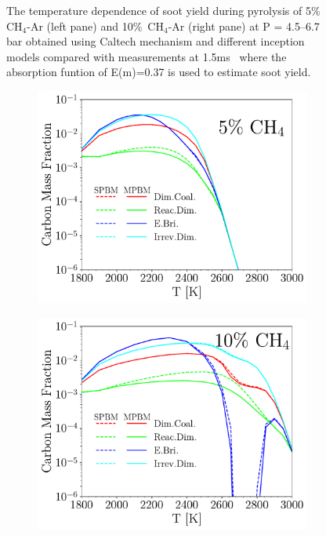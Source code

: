 \begin{figure}[H]
\begin{subfigure}[t]{0.4\textwidth}
	\end{subfigure}
	\caption{The temperature dependence of soot yield during pyrolysis of 5\%~$\mathrm{CH_4}$-Ar (left pane) and 10\%~$\mathrm{CH_4}$-Ar (right pane) at $\mathrm{P}$ = 4.5–6.7 bar obtained using Caltech mechanism and different inception models compared with measurements at 1.5ms~\cite{agafonov2016unified} where the absorption funtion of E(m)=0.37 is used to estimate soot yield.}
	\label{fig:shocktubeyield} 
\end{figure}


\begin{figure}[H]
	\centering
	\begin{subfigure}[t]{0.4\textwidth}
		\includegraphics[width=1\textwidth]{Figures/Results/Shocktube/Agafonov2016/5CH4/AAAA.pdf}
	\end{subfigure}
	\begin{subfigure}[t]{0.4\textwidth}
		\includegraphics[width=1\textwidth]{Figures/Results/Shocktube/Agafonov2016/10CH4/AAAA.pdf}

\end{subfigure}
\end{figure}
